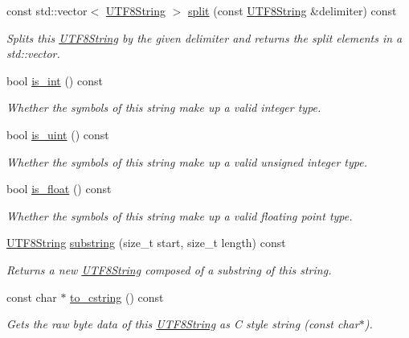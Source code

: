 \begin{DoxyCompactItemize}
const std\+::vector$<$ \hyperlink{classchaos_1_1str_1_1_u_t_f8_string}{U\+T\+F8\+String} $>$ \hyperlink{classchaos_1_1str_1_1_u_t_f8_string_ac5da4c989f6394c38b0fb82a252099db}{split} (const \hyperlink{classchaos_1_1str_1_1_u_t_f8_string}{U\+T\+F8\+String} \&delimiter) const 
\begin{DoxyCompactList}\small\item\em Splits this \hyperlink{classchaos_1_1str_1_1_u_t_f8_string}{U\+T\+F8\+String} by the given delimiter and returns the split elements in a std\+::vector. \end{DoxyCompactList}\item 
bool \hyperlink{classchaos_1_1str_1_1_u_t_f8_string_a64f529f30034281560805b97826c5e13}{is\+\_\+int} () const 
\begin{DoxyCompactList}\small\item\em Whether the symbols of this string make up a valid integer type. \end{DoxyCompactList}\item 
bool \hyperlink{classchaos_1_1str_1_1_u_t_f8_string_a989763da3e7eed8664cd2e5c41ea7e00}{is\+\_\+uint} () const 
\begin{DoxyCompactList}\small\item\em Whether the symbols of this string make up a valid unsigned integer type. \end{DoxyCompactList}\item 
bool \hyperlink{classchaos_1_1str_1_1_u_t_f8_string_a2fbd69fb90a390df37c119577d4d3c6a}{is\+\_\+float} () const 
\begin{DoxyCompactList}\small\item\em Whether the symbols of this string make up a valid floating point type. \end{DoxyCompactList}\item 
\hyperlink{classchaos_1_1str_1_1_u_t_f8_string}{U\+T\+F8\+String} \hyperlink{classchaos_1_1str_1_1_u_t_f8_string_a2d50ab58715264ae175f521816bf670c}{substring} (size\+\_\+t start, size\+\_\+t length) const 
\begin{DoxyCompactList}\small\item\em Returns a new \hyperlink{classchaos_1_1str_1_1_u_t_f8_string}{U\+T\+F8\+String} composed of a substring of this string. \end{DoxyCompactList}\item 
const char $\ast$ \hyperlink{classchaos_1_1str_1_1_u_t_f8_string_aa6fd66af34d7a3c4a495860952e97557}{to\+\_\+cstring} () const 
\begin{DoxyCompactList}\small\item\em Gets the raw byte data of this \hyperlink{classchaos_1_1str_1_1_u_t_f8_string}{U\+T\+F8\+String} as C style string ({\ttfamily const char$\ast$}). \end{DoxyCompactList}\item 

\end{DoxyCompactItemize}
